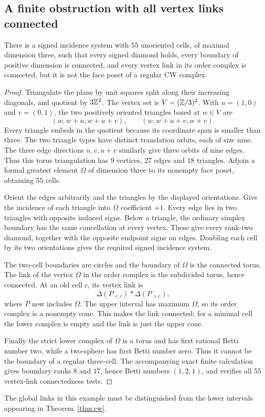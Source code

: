 \subsection{A finite obstruction with all vertex links connected}
\begin{counterexample}\label{ex:torus-55}
There is a signed incidence system with $55$ unoriented cells,
of maximal dimension three, such that every signed diamond holds,
every boundary of positive dimension is connected, and every
vertex link in its order complex is connected, but it is not
the face poset of a regular CW complex.
\end{counterexample}
\begin{proof}
Triangulate the plane by unit squares split along their increasing
diagonals, and quotient by $3\mathbb Z^2$. The vertex set is
$V=(\mathbb Z/3)^2$. With $u=(1,0)$ and $v=(0,1)$, the two positively
oriented triangles based at $w\in V$ are
\[
 (w,w+u,w+u+v),\qquad (w,w+u+v,w+v).
\]
Every triangle embeds in the quotient because its coordinate span
is smaller than three. The two triangle types have distinct
translation orbits, each of size nine. The three edge directions
$u,v,u+v$ similarly give three orbits of nine edges. Thus this
torus triangulation has $9$ vertices, $27$ edges and $18$ triangles.
Adjoin a formal greatest element $\Omega$ of dimension three to
its nonempty face poset, obtaining $55$ cells.

Orient the edges arbitrarily and the triangles by the displayed
orientations. Give the incidence of each triangle into $\Omega$
coefficient $+1$. Every edge lies in two triangles with opposite
induced signs. Below a triangle, the ordinary simplex boundary
has the same cancellation at every vertex. These give every
rank-two diamond, together with the opposite endpoint signs on
edges. Doubling each cell by its two orientations gives the
required signed incidence system.

The two-cell boundaries are circles and the boundary of $\Omega$
is the connected torus. The link of the vertex $\Omega$ in the
order complex is the subdivided torus, hence connected. At an
old cell $c$, its vertex link is
\[
 \Delta(P_{<c})*\Delta(P_{>c}),
\]
where $P$ now includes $\Omega$. The upper interval has maximum
$\Omega$, so its order complex is a nonempty cone. This makes
the link connected; for a minimal cell the lower complex is
empty and the link is just the upper cone.

Finally the strict lower complex of $\Omega$ is a torus and has
first rational Betti number two, while a two-sphere has first
Betti number zero. Thus it cannot be the boundary of a regular
three-cell. The accompanying exact finite calculation gives
boundary ranks $8$ and $17$, hence Betti numbers $(1,2,1)$,
and verifies all $55$ vertex-link connectedness tests.
\end{proof}
The global links in this example must be distinguished from
the lower intervals appearing in Theorem~\ref{thm:cw}.
